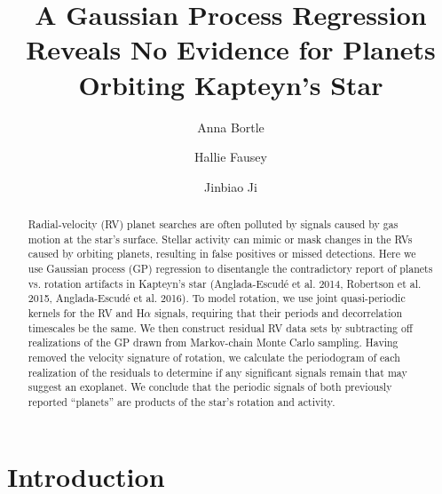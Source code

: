 \documentclass{aastex6}
\begin{document}
\pagestyle{plain}

\title{A Gaussian Process Regression Reveals No Evidence for Planets
Orbiting Kapteyn's Star}

\author{Anna Bortle}
\author{Hallie Fausey}
\author{Jinbiao Ji}



\begin{abstract}

  Radial-velocity (RV) planet searches are often polluted by signals caused by gas motion at the star's surface. Stellar activity can mimic or mask changes in the RVs caused by orbiting planets, resulting in false positives or missed detections.
  Here we use Gaussian process (GP) regression to disentangle the contradictory report of planets vs. rotation artifacts in Kapteyn's star (Anglada-Escud\'e et al. 2014, Robertson et al. 2015, Anglada-Escud\'e et al. 2016).
  To model rotation, we use joint quasi-periodic kernels for the RV and H$\alpha$ signals, requiring that their periods and decorrelation timescales be the same.
  We then construct residual RV data sets by subtracting off realizations of the GP drawn from Markov-chain Monte Carlo sampling.
  Having removed the velocity signature of rotation, we calculate the periodogram of each realization of the residuals to determine if any significant signals remain that may suggest an exoplanet.
  We conclude that the periodic signals of both previously reported ``planets'' are products of the star's rotation and activity.

\end{abstract}


\maketitle

\section{Introduction}\label{sec:intro}
\end{document}
